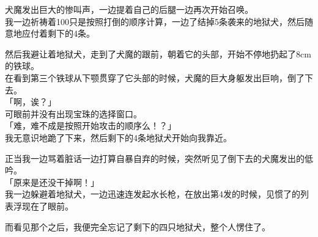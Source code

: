 犬魔发出巨大的惨叫声，一边提着自己的后腿一边再次开始召唤。\\

我一边祈祷着100只是按照打倒的顺序计算，一边了结掉5条袭来的地狱犬，然后随意地应付着剩下的4条。

然后我避让着地狱犬，走到了犬魔的跟前，朝着它的头部，开始不停地扔起了8cm的铁球。\\

在看到第三个铁球从下颚贯穿了它头部的时候，犬魔的巨大身躯发出巨响，倒了下去。\\

「啊，诶？」\\

可眼前并没有出现宝珠的选择窗口。\\

「难，难不成是按照开始攻击的顺序么！？」\\

我无意识地跪了下来，然后剩下的4条地狱犬开始向我靠近。

正当我一边骂着脏话一边打算自暴自弃的时候，突然听见了倒下去的犬魔发出的低吟。\\

「原来是还没干掉啊！」\\

我一边躲避着地狱犬，一边迅速连发起水长枪，在放出第4发的时候，见惯了的列表浮现在了眼前。

而看见那个之后，我便完全忘记了剩下的四只地狱犬，整个人愣住了。\\


